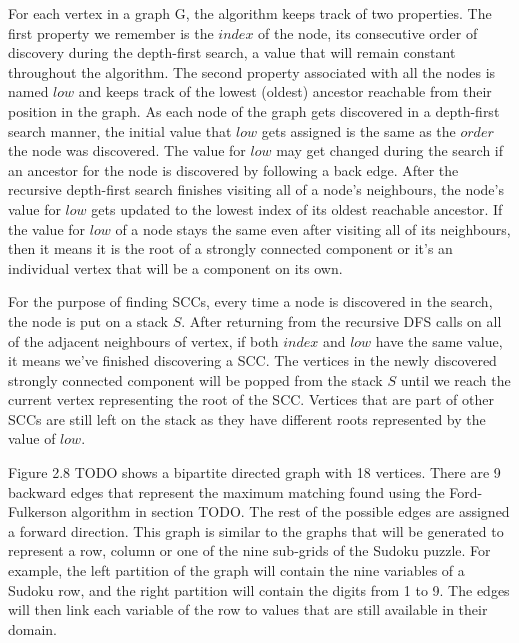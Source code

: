 \documentclass{l4proj}
\begin{document}
\noindent For each vertex in a graph G, the algorithm keeps track of two properties. The first property we remember is the $index$ of the node, its consecutive order of discovery during the depth-first search, a value that will remain constant throughout the algorithm. The second property associated with all the nodes is named $low$ and keeps track of the lowest (oldest) ancestor reachable from their position in the graph. As each node of the graph gets discovered in a depth-first search manner, the initial value that $low$ gets assigned is the same as the $order$ the node was discovered. The value for $low$ may get changed during the search if an ancestor for the node is discovered by following a back edge. After the recursive depth-first search finishes visiting all of a node’s neighbours, the node’s value for $low$ gets updated to the lowest index of its oldest reachable ancestor. If the value for $low$ of a node stays the same even after visiting all of its neighbours, then it means it is the root of a strongly connected component or it’s an individual vertex that will be a component on its own. \cite{tarjan1972depth}

\noindent For the purpose of finding SCCs, every time a node is discovered in the search, the node is put on a stack $S$. After returning from the recursive DFS calls on all of the adjacent neighbours of vertex, if both $index$ and $low$ have the same value, it means we’ve finished discovering a SCC. The vertices in the newly discovered strongly connected component will be popped from the stack $S$ until we reach the current vertex representing the root of the SCC. Vertices that are part of other SCCs are still left on the stack as they have different roots represented by the value of $low$.

\noindent Figure 2.8  TODO shows a bipartite directed graph with 18 vertices. There are 9 backward edges that represent the maximum matching found using the Ford-Fulkerson algorithm in section TODO. The rest of the possible edges are assigned a forward direction. This graph is similar to the graphs that will be generated to represent a row, column or one of the nine sub-grids of the Sudoku puzzle. For example, the left partition of the graph will contain the nine variables of a Sudoku row, and the right partition will contain the digits from 1 to 9. The edges will then link each variable of the row to values that are still available in their domain.
\end{document}
